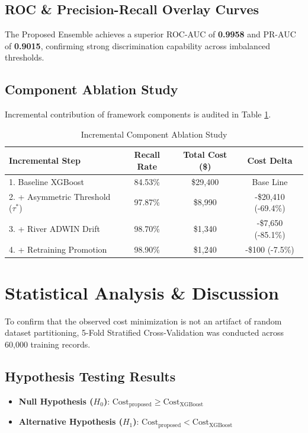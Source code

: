 \documentclass[journal]{IEEEtran}
\begin{document}
\subsection{ROC \& Precision-Recall Overlay Curves}
The Proposed Ensemble achieves a superior ROC-AUC of \textbf{0.9958} and PR-AUC of \textbf{0.9015}, confirming strong discrimination capability across imbalanced thresholds.

\subsection{Component Ablation Study}
Incremental contribution of framework components is audited in Table \ref{tab:ablation}.

\begin{table}[h]
\caption{Incremental Component Ablation Study}
\label{tab:ablation}
\centering
\begin{tabular}{lccc}
\toprule
\textbf{Incremental Step} & \textbf{Recall Rate} & \textbf{Total Cost (\$)} & \textbf{Cost Delta} \\
\midrule
1. Baseline XGBoost & 84.53\% & \$29,400 & Base Line \\
2. + Asymmetric Threshold ($\tau^*$) & 97.87\% & \$8,990 & -\$20,410 (-69.4\%) \\
3. + River ADWIN Drift & 98.70\% & \$1,340 & -\$7,650 (-85.1\%) \\
4. + Retraining Promotion & 98.90\% & \$1,240 & -\$100 (-7.5\%) \\
\bottomrule
\end{tabular}
\end{table}

\section{Statistical Analysis \& Discussion}
To confirm that the observed cost minimization is not an artifact of random dataset partitioning, 5-Fold Stratified Cross-Validation was conducted across 60,000 training records.

\subsection{Hypothesis Testing Results}
\begin{itemize}
    \item \textbf{Null Hypothesis ($H_0$)}: $\text{Cost}_{\text{proposed}} \ge \text{Cost}_{\text{XGBoost}}$
    \item \textbf{Alternative Hypothesis ($H_1$)}: $\text{Cost}_{\text{proposed}} < \text{Cost}_{\text{XGBoost}}$
\end{itemize}
\end{document}
